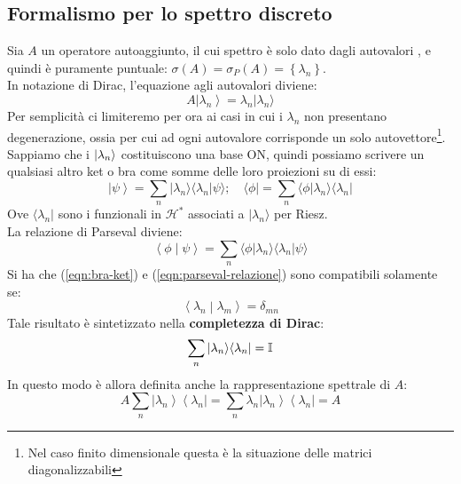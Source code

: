 \documentclass[../../FisicaTeorica.tex]{subfiles}
\begin{document}
\subsection{Formalismo per lo spettro discreto}
Sia $A$ un operatore autoaggiunto, il cui spettro è solo dato dagli autovalori , e quindi è puramente puntuale: $\sigma \left(A\right)= \sigma_P\left(A\right)= \left\{\lambda_n\right\}$.\\
In notazione di Dirac, l'equazione agli autovalori diviene:
\[
A \left|\lambda_n\right\rangle=\lambda_n|\lambda_n \rangle 
\]
Per semplicità ci limiteremo per ora ai casi in cui i $\lambda_n$ non presentano degenerazione, ossia per cui ad ogni autovalore corrisponde un solo autovettore\footnote{Nel caso finito dimensionale questa è la situazione delle matrici diagonalizzabili}.\\
Sappiamo che i $\ket{\lambda_n}$  costituiscono una base ON, quindi possiamo scrivere un qualsiasi altro ket o bra come somme delle loro proiezioni su di essi:
\begin{equation}
\left|\psi\right\rangle=\sum_{n}{|\lambda_n\rangle \langle\lambda_n|\psi\rangle }; \quad 
\langle \phi |=\sum_{n}{\langle\phi|\lambda_n\rangle \langle\lambda_n|}
\label{eqn:bra-ket}
\end{equation}
Ove $\langle \lambda_n|$ sono i funzionali in $\mathcal{H}^\ast$ associati a $|\lambda_n \rangle$  per Riesz.\\
La relazione di Parseval diviene:
\begin{equation}
\left\langle\phi\middle|\psi\right\rangle=\sum_{n}{\langle\phi|\lambda_n\rangle \langle\lambda_n|\psi\rangle }
\label{eqn:parseval-relazione}
\end{equation}
Si ha che (\ref{eqn:bra-ket}) e (\ref{eqn:parseval-relazione}) sono compatibili solamente se:
\[
\left\langle\lambda_n\middle|\lambda_m\right\rangle=\delta_{mn}
\]
Tale risultato è sintetizzato nella \textbf{completezza di Dirac}:
\[
\sum_{n}{|\lambda_n\rangle \langle\lambda_n|}=\mathbb{I}
\]
In questo modo è allora definita anche la rappresentazione spettrale di $A$:
\[
A\sum_{n}{\left|\lambda_n\right\rangle\left\langle\lambda_n\right|=\sum_{n}{\lambda_n\left|\lambda_n\right\rangle\left\langle\lambda_n\right|=A}}
\]
\end{document}
